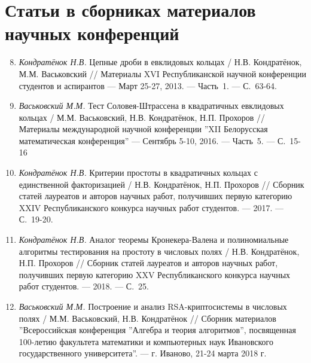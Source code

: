 \section*{\fontsize{14}{15}\selectfont Статьи в сборниках материалов научных конференций}
\vspace{-4ex}

\begin{enumerate}
\setcounter{enumi}{7}

    \item \label{source:Republican_Scientific_Conference_of_Students_and_Postgraduates_2013}
    \textit{Кондратёнок Н.В.} Цепные дроби в евклидовых кольцах / Н.В. Кондратёнок, М.М. Васьковский // Материалы XVI Республиканской научной конференции студентов и аспирантов --- Март 25-27, 2013. --- Часть~1. --- С.~63-64.

    \item \label{source:XII_Belarussian_math_conference_2016}
    \textit{Васьковский М.М.} Тест Соловея-Штрассена в квадратичных евклидовых кольцах / М.М. Васьковский, Н.В. Кондратёнок, Н.П. Прохоров // Материалы международной научной конференции ''XII Белорусская математическая конференция'' --- Сентябрь 5-10, 2016. --- Часть~5. --- С.~15-16

    \item \label{source:Collection_of_articles_by_laureates_2017}
    \textit{Кондратёнок Н.В.} Критерии простоты в квадратичных кольцах с единственной факторизацией / Н.В. Кондратёнок, Н.П. Прохоров // Сборник статей лауреатов и авторов научных работ, получивших первую категорию XXIV Республиканского конкурса научных работ студентов. --- 2017. --- С.~19-20.

    \item \label{source:Collection_of_articles_by_laureates_2018}
    \textit{Кондратёнок Н.В.} Аналог теоремы Кронекера-Валена и полиномиальные алгоритмы тестирования на простоту в числовых полях / Н.В. Кондратёнок, Н.П. Прохоров // Сборник статей лауреатов и авторов научных работ, получивших первую категорию XXV Республиканского конкурса научных работ студентов. --- 2018. --- С.~25.

    \item \label{source:Algebra_and_theory_of_algorithms}
    \textit{Васьковский М.М.} Построение и анализ RSA-криптосистемы в числовых полях / М.М. Васьковский, Н.В. Кондратёнок // Сборник материалов ''Всероссийская конференция ''Алгебра и теория алгоритмов'', посвященная 100-летию факультета математики и компьютерных наук Ивановского государственного университета''. --- г. Иваново, 21-24 марта 2018 г.


\end{enumerate}
